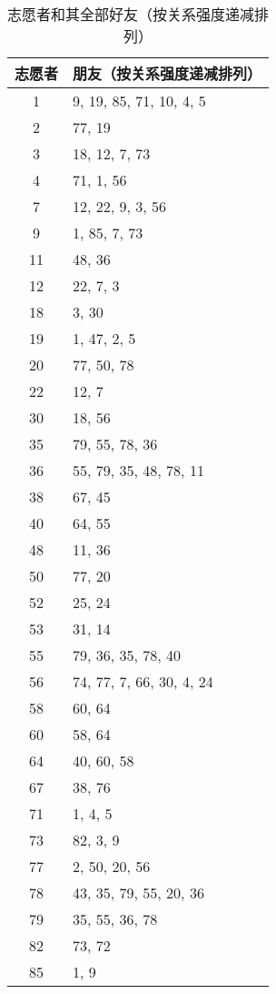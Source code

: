 \begin{table}[htb]
  \centering
  \begin{minipage}[t]{0.8\linewidth} %
  \caption[真实结果]{志愿者和其全部好友（按关系强度递减排列）}
  \label{tab:truthresult}
    \begin{tabular*}{\linewidth}{cp{10cm}}
      \toprule[1.5pt]
      {志愿者} & {朋友（按关系强度递减排列）} \\
      \midrule[1pt]
      1 & 9, 19, 85, 71, 10, 4, 5\\
      2 & 77, 19\\
      3 & 18, 12, 7, 73\\
      4 & 71, 1, 56\\
      7 & 12, 22, 9, 3, 56\\
      9 & 1, 85, 7, 73\\
      11 & 48, 36\\
      12 & 22, 7, 3\\
      18 & 3, 30\\
      19 & 1, 47, 2, 5\\
      20 & 77, 50, 78\\
      22 & 12, 7\\
      30 & 18, 56\\
      35 & 79, 55, 78, 36\\
      36 & 55, 79, 35, 48, 78, 11\\
      38 & 67, 45\\
      40 & 64, 55\\
      48 & 11, 36\\
      50 & 77, 20\\
      52 & 25, 24\\
      53 & 31, 14\\
      55 & 79, 36, 35, 78, 40\\
      56 & 74, 77, 7, 66, 30, 4, 24\\
      58 & 60, 64\\
      60 & 58, 64\\
      64 & 40, 60, 58\\
      67 & 38, 76\\
      71 & 1, 4, 5\\
      73 & 82, 3, 9\\
      77 & 2, 50, 20, 56\\
      78 & 43, 35, 79, 55, 20, 36\\
      79 & 35, 55, 36, 78\\
      82 & 73, 72\\
      85 & 1, 9\\
      \bottomrule[1.5pt]
    \end{tabular*}
  \end{minipage}
\end{table}
